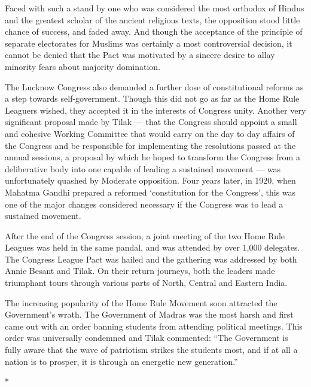 \begin{multicols}{2}
Faced with such a stand by one who was considered the most orthodox of Hindus and the greatest scholar of the ancient religious texts, the opposition stood little chance of success, and faded away. And though the acceptance of the principle of separate electorates for Muslims was certainly a most controversial decision, it cannot be denied that the Pact was motivated by a sincere desire to allay minority fears about majority domination.

The Lucknow Congress also demanded a further dose of constitutional reforms as a step towards self-government. Though this did not go as far as the Home Rule Leaguers wished, they accepted it in the interests of Congress unity. Another very significant proposal made by Tilak --- that the Congress should appoint a small and cohesive Working Committee that would carry on the day to day affairs of the Congress and be responsible for implementing the resolutions passed at the annual sessions, a proposal by which he hoped to transform the Congress from a deliberative body into one capable of leading a sustained movement --- was unfortunately quashed by Moderate opposition. Four years later, in 1920, when Mahatma Gandhi prepared a reformed `constitution for the Congress', this was one of the major changes considered necessary if the Congress was to lead a sustained movement.

After the end of the Congress session, a joint meeting of the two Home Rule Leagues was held in the same pandal, and was attended by over 1,000 delegates. The Congress League Pact was hailed and the gathering was addressed by both Annie Besant and Tilak. On their return journeys, both the leaders made triumphant tours through various parts of North, Central and Eastern India.

The increasing popularity of the Home Rule Movement soon attracted the Government's wrath. The Government of Madras was the most harsh and first came out with an order banning students from attending political meetings. This order was universally condemned and Tilak commented: ``The Government is fully aware that the wave of patriotism strikes the students most, and if at all a nation is to prosper, it is through an energetic new generation.''

\begin{center}*\end{center}


\end{multicols}
